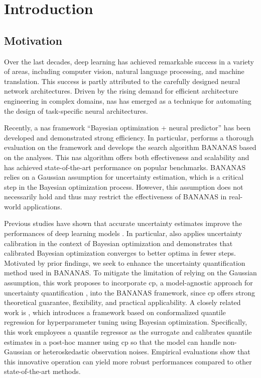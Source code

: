 \documentclass[a4paper,oneside,bibliography=totoc]{scrbook}
\begin{document}
\begingroup%
\hypersetup{hidelinks} %
\tableofcontents%
\endgroup


\mainmatter  %

\chapter{Introduction}
\label{ch:intro}

\section{Motivation}
Over the last decades, deep learning has achieved remarkable success in a variety of areas, including computer vision, natural language processing, and machine translation. This success is partly attributed to the carefully designed neural network architectures. Driven by the rising demand for efficient architecture engineering in complex domains, \gls{nas} has emerged as a technique for automating the design of task-specific neural architectures.

Recently, a \gls{nas} framework “Bayesian optimization + neural predictor” has been developed and demonstrated strong efficiency. In particular, \cite{white2019bananas}  performs a thorough evaluation on the framework and develops the search algorithm BANANAS based on the analyses. This \gls{nas} algorithm offers both effectiveness and scalability and has achieved state-of-the-art performance on popular benchmarks. BANANAS relies on a Gaussian assumption for uncertainty estimation, which is a critical step in the Bayesian optimization process. However, this assumption does not necessarily hold and thus may restrict the effectiveness of BANANAS in real-world applications.

Previous studies have shown that accurate uncertainty estimates improve the performances of deep learning models \cite{pmlr-v80-kuleshov18a}. In particular, \cite{deshpande2024online} also applies uncertainty calibration in the context of Bayesian optimization and demonstrates that calibrated Bayesian optimization converges to better optima in fewer steps. Motivated by prior findings, we seek to enhance the uncertainty quantification method used in BANANAS. To mitigate the limitation of relying on the Gaussian assumption, this work proposes to incorporate \gls{cp},  a model-agnostic approach for uncertainty quantification \cite{shafer2008tutorial, vovk2005algorithmic}, into the BANANAS framework, since \gls{cp} offers strong theoretical guarantee, flexibility, and practical applicability. A closely related work is \cite{salinas2023optimizing}, which introduces a framework based on conformalized quantile regression for hyperparameter tuning using Bayesian optimization. Specifically, this work employees a quantile regressor as the surrogate and calibrates quantile estimates in a post-hoc manner using \gls{cp} so that the model can handle non-Gaussian or heteroskedastic observation noises. Empirical evaluations show that this innovative operation can yield more robust performances compared to other state-of-the-art methods.
\end{document}
